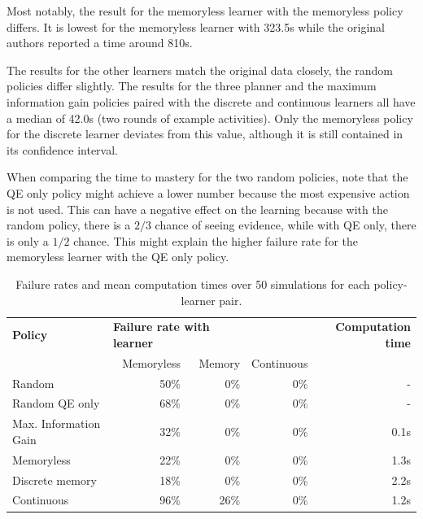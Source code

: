 Most notably, the result for the memoryless learner with the memoryless policy differs. It is lowest for the memoryless learner with 323.5s while the original authors reported a time around 810s.

The results for the other learners match the original data closely, the random policies differ slightly.
The results for the three planner and the maximum information gain policies paired with the discrete and continuous learners all have a median of 42.0s (two rounds of example activities). 
Only the memoryless policy for the discrete learner deviates from this value, although it is still contained in its confidence interval.

When comparing the time to mastery for the two random policies, note that the QE only policy might achieve a lower number because the most expensive action is not used.
This can have a negative effect on the learning because with the random policy, there is a $2/3$ chance of seeing evidence, while with QE only, there is only a $1/2$ chance. 
This might explain the higher failure rate for the memoryless learner with the QE only policy.


\begin{table}[h]
    \centering
    \small
    \begin{tabular}{l|rrr|r}
        \hline
        \textbf{Policy} & \multicolumn{2}{l}{\textbf{Failure rate with learner}} & & \textbf{Computation time}\\
                        & Memoryless &  Memory & Continuous &  \\
        \hline
        Random          & 50\% & 0\% & 0\% & - \\
        Random QE only  & 68\% & 0\% & 0\% & - \\
        Max. Information Gain & 32\% & 0\% & 0\% & 0.1s \\
        \hline
        Memoryless      & 22\% & 0\% & 0\% & 1.3s \\
        Discrete memory & 18\% & 0\% & 0\% & 2.2s\\
        Continuous      & 96\% & 26\% & 0\% & 1.2s \\
        \hline
    \end{tabular}
    \caption{Failure rates and mean computation times over 50 simulations for each policy-learner pair.
    }
    \label{tab:failures-t1}
\end{table}

